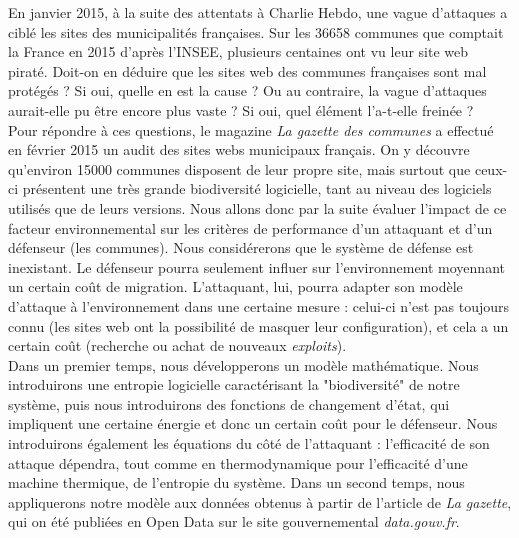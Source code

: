 En janvier 2015, à la suite des attentats à Charlie Hebdo, une vague d'attaques a ciblé les sites des municipalités françaises\cite{courrier}.
Sur les 36658 communes que comptait la France en 2015 d'après l'INSEE\cite{communes_INSEE}, plusieurs centaines ont vu leur site web piraté.
Doit-on en déduire que les sites web des communes françaises sont mal protégés ? Si oui, quelle en est la cause ?
Ou au contraire, la vague d'attaques aurait-elle pu être encore plus vaste ? Si oui, quel élément l'a-t-elle freinée ?\\
Pour répondre à ces questions, le magazine \textit{La gazette des communes} a effectué en février 2015 un audit des sites webs municipaux français\cite{gazette}. On y découvre qu'environ 15000 communes disposent de leur propre site, mais surtout que ceux-ci présentent une très grande biodiversité logicielle, tant au niveau des logiciels utilisés que de leurs versions.
Nous allons donc par la suite évaluer l'impact de ce facteur environnemental sur les critères de performance d'un attaquant et d'un défenseur (les communes). Nous considérerons que le système de défense est inexistant. Le défenseur pourra seulement influer sur l'environnement moyennant un certain coût de migration. L'attaquant, lui, pourra adapter son modèle d'attaque à l'environnement dans une certaine mesure : celui-ci n'est pas toujours connu (les sites web ont la possibilité de masquer leur configuration), et cela a un certain coût (recherche ou achat de nouveaux \textit{exploits}).\\
Dans un premier temps, nous développerons un modèle mathématique. Nous introduirons une entropie logicielle caractérisant la "biodiversité" de notre système, puis nous introduirons des fonctions de changement d'état, qui impliquent une certaine énergie et donc un certain coût pour le défenseur. Nous introduirons également les équations du côté de l'attaquant : l'efficacité de son attaque dépendra, tout comme en thermodynamique pour l'efficacité d'une machine thermique, de l'entropie du système.
Dans un second temps, nous appliquerons notre modèle aux données obtenus à partir de l'article de \textit{La gazette}, qui on été publiées en Open Data sur le site gouvernemental \textit{data.gouv.fr}\cite{data.gouv}.
